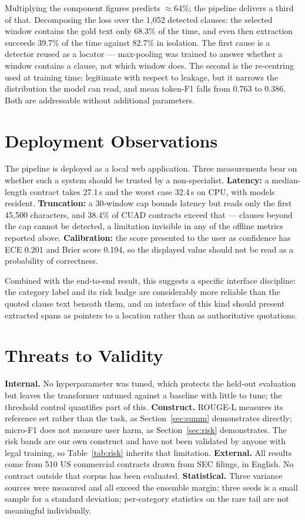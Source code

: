 \documentclass[journal,a4paper]{IEEEtran}
\begin{document}
Multiplying the component figures predicts $\approx$64\%; the pipeline delivers a third of
that. Decomposing the loss over the 1{,}052 detected clauses: the selected window contains the
gold text only 68.3\% of the time, and even then extraction succeeds 39.7\% of the time against
82.7\% in isolation. The first cause is a detector reused as a locator --- max-pooling was
trained to answer whether a window contains a clause, not which window does. The second is the
re-centring used at training time: legitimate with respect to leakage, but it narrows the
distribution the model can read, and mean token-F1 falls from 0.763 to 0.386. Both are
addressable without additional parameters.

\section{Deployment Observations}
The pipeline is deployed as a local web application. Three measurements bear on whether such a
system should be trusted by a non-specialist. \textbf{Latency:} a median-length contract takes
27.1\,s and the worst case 32.4\,s on CPU, with models resident. \textbf{Truncation:} a
30-window cap bounds latency but reads only the first 45{,}500 characters, and 38.4\% of CUAD
contracts exceed that --- clauses beyond the cap cannot be detected, a limitation invisible in
any of the offline metrics reported above. \textbf{Calibration:} the score presented to the user
as confidence has ECE 0.201 and Brier score 0.194, so the displayed value should not be read as
a probability of correctness.

Combined with the end-to-end result, this suggests a specific interface discipline: the category
label and its risk badge are considerably more reliable than the quoted clause text beneath
them, and an interface of this kind should present extracted spans as pointers to a location
rather than as authoritative quotations.

\section{Threats to Validity}
\label{sec:threats}
\textbf{Internal.} No hyperparameter was tuned, which protects the held-out evaluation but
leaves the transformer untuned against a baseline with little to tune; the threshold control
quantifies part of this.
\textbf{Construct.} ROUGE-L measures its reference set rather than the task, as
Section~\ref{sec:summ} demonstrates directly; micro-F1 does not measure user harm, as
Section~\ref{sec:risk} demonstrates. The risk bands are our own construct and have not been
validated by anyone with legal training, so Table~\ref{tab:risk} inherits that limitation.
\textbf{External.} All results come from 510 US commercial contracts drawn from SEC filings, in
English. No contract outside that corpus has been evaluated.
\textbf{Statistical.} Three variance sources were measured and all exceed the ensemble margin;
three seeds is a small sample for a standard deviation; per-category statistics on the rare tail
are not meaningful individually.
\end{document}
